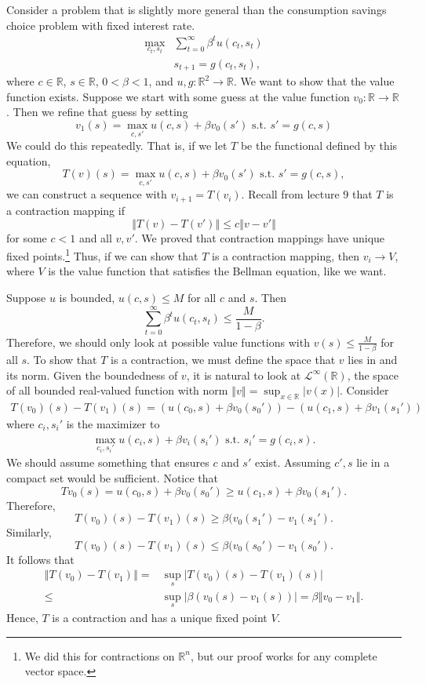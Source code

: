 \documentclass[12pt,reqno]{amsart}
\theoremstyle{definition}
\def\R{\mathbb{R}}
\newcommand{\norm}[1]{\left\Vert {#1} \right\Vert}
\renewcommand{\to}{{\rightarrow}}
\begin{document}
Consider a problem that is slightly more general than the consumption
savings choice problem with fixed interest rate.
\begin{align*}
  \max_{c_t,s_t} & \sum_{t=0}^\infty \beta^t u(c_t,s_t) \\
  & s_{t+1} = g(c_t,s_t),
\end{align*}
where $c \in \R$, $s \in \R$, $0<\beta<1$, and $u,g:\R^2 \to \R$.
We want to show that the value function exists. Suppose we start with
some guess at the value function $v_0:\R\to \R$. Then we refine that guess by
setting 
\[ v_1(s) = \max_{c,s'} u(c,s) + \beta v_0(s') \text{ s.t. }
s'=g(c,s) \]
We could do this repeatedly. That is, if we let $T$ be the functional
defined by this equation,
\[ T(v)(s) = \max_{c,s'} u(c,s) + \beta v_0(s') \text{ s.t. }
s'=g(c,s), \]
we can construct a sequence with $v_{i+1} = T(v_i)$. Recall from
lecture 9 that $T$ is a contraction mapping if 
\[ \norm{T(v) - T(v')} \leq c \norm{v-v'} \]
for some $c<1$ and all $v,v'$. We proved that contraction mappings
have unique fixed points.\footnote{We did this for contractions on
  $\R^n$, but our proof works for any complete vector space.} Thus, if
we can show that $T$ is a contraction mapping, then $v_i \to V$, where
$V$ is the value function that satisfies the Bellman equation, like we
want. 

Suppose $u$ is bounded, $u(c,s) \leq M$ for all $c$ and $s$. Then 
\[ \sum_{t=0}^\infty \beta^t u(c_t,s_t)  \leq \frac{M}{1-\beta}. \]
Therefore, we should only look at possible value functions with $v(s)
\leq \frac{M}{1-\beta}$ for all $s$. To show that $T$ is a
contraction, we must define the space that $v$ lies in and its
norm. Given the boundedness of $v$, it is natural to look at
$\mathcal{L}^\infty(\R)$, the space of all bounded real-valued function
with norm $\norm{v} = \sup_{x \in \R} |v(x)|$. Consider
\begin{align*}
  T(v_0)(s)-T(v_1)(s) =  \left(u(c_0,s) + \beta v_0(s_0')  \right) -
  \left(u(c_1,s) + \beta v_1(s_1')  \right)
\end{align*} 
where $c_i,s_i'$ is the maximizer to 
\begin{align*}
  \max_{c_i,s_i'} u(c_i,s) + \beta v_i(s_i') \text{ s.t. }
  s_i'=g(c_i,s).
\end{align*}
We should assume something that ensures $c$ and $s'$ exist. Assuming
$c',s$ lie in a compact set would be sufficient. Notice that
\[ T v_0 (s) = u(c_0,s) + \beta v_0(s_0')  \geq u(c_1,s) + \beta
v_0(s_1'). \]
Therefore,
\[ T(v_0)(s) - T(v_1)(s) \geq \beta (v_0(s_1') - v_1(s_1'). \]
Similarly,
\[ T(v_0)(s)-T(v_1)(s) \leq \beta (v_0(s_0') - v_1(s_0'). \]
It follows that
\begin{align*}
  \norm{T(v_0)-T(v_1)} = & \sup_{s} \left\vert T(v_0)(s)-T(v_1)(s) \right\vert \\
  \leq & \sup_s \left\vert \beta(v_0(s) -v_1(s)) \right\vert = \beta
  \norm{v_0 - v_1}.
\end{align*}
Hence, $T$ is a contraction and has a unique fixed point $V$. 
\end{document}
